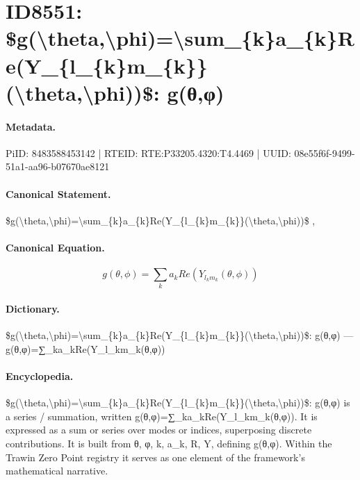 \section*{ID8551: \$g(\textbackslash{}theta,\textbackslash{}phi)=\textbackslash{}sum\_\{k\}a\_\{k\}Re(Y\_\{l\_\{k\}m\_\{k\}\}(\textbackslash{}theta,\textbackslash{}phi))\$: g(θ,φ)}
\paragraph{Metadata.}
PiID: 8483588453142 | RTEID: RTE:P33205.4320:T4.4469 | UUID: 08e55f6f-9499-51a1-aa96-b07670ae8121

\paragraph{Canonical Statement.}
\$g(\textbackslash{}theta,\textbackslash{}phi)=\textbackslash{}sum\_\{k\}a\_\{k\}Re(Y\_\{l\_\{k\}m\_\{k\}\}(\textbackslash{}theta,\textbackslash{}phi))\$ ,

\paragraph{Canonical Equation.}
\[
g(\theta,\phi)=\sum_{k}a_{k}Re(Y_{l_{k}m_{k}}(\theta,\phi))
\]

\paragraph{Dictionary.}
\$g(\textbackslash{}theta,\textbackslash{}phi)=\textbackslash{}sum\_\{k\}a\_\{k\}Re(Y\_\{l\_\{k\}m\_\{k\}\}(\textbackslash{}theta,\textbackslash{}phi))\$: g(θ,φ) — g(θ,φ)=∑\_ka\_kRe(Y\_l\_km\_k(θ,φ))

\paragraph{Encyclopedia.}
\$g(\textbackslash{}theta,\textbackslash{}phi)=\textbackslash{}sum\_\{k\}a\_\{k\}Re(Y\_\{l\_\{k\}m\_\{k\}\}(\textbackslash{}theta,\textbackslash{}phi))\$: g(θ,φ) is a series / summation, written g(θ,φ)=∑\_ka\_kRe(Y\_l\_km\_k(θ,φ)). It is expressed as a sum or series over modes or indices, superposing discrete contributions. It is built from θ, φ, k, a\_k, R, Y, defining g(θ,φ). Within the Trawin Zero Point registry it serves as one element of the framework's mathematical narrative.
